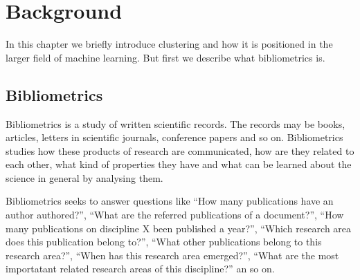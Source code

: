 \chapter{Background}
\label{chapter:background}

% 


In this chapter we briefly introduce clustering and how it is 
positioned in the larger field of machine learning. But first we
describe what bibliometrics is.

\section{Bibliometrics}
\label{sec:bibliometrics}
Bibliometrics is a study of written scientific records. The 
records may be books, articles, letters in scientific journals, 
conference papers and so on. Bibliometrics studies how these 
products of research are communicated, how are they related to 
each other, what kind of properties they have and what can be 
learned about the science in general by analysing them.

Bibliometrics seeks to answer questions like ``How many 
publications have an author authored?'', ``What are the referred 
publications of a document?'', ``How many publications 
on discipline X been published a year?'', ``Which research area
does this publication belong to?'', ``What other publications 
belong to this research area?'', ``When has this research area
emerged?'', ``What are the most importatant related research areas
of this discipline?'' an so on. 

